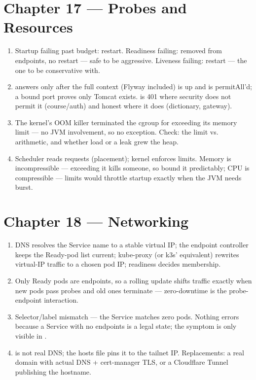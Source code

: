 \section*{Chapter 17 --- Probes and Resources}
\begin{enumerate}
  \item Startup failing past budget: restart. Readiness failing:
  removed from endpoints, no restart --- safe to be aggressive.
  Liveness failing: restart --- the one to be conservative with.
  \item {} answers only after the full context
  (Flyway included) is up and is permitAll'd; a bound port proves
  only Tomcat exists.  is 401 where security
  does not permit it (course/auth) and honest where it does
  (dictionary, gateway).
  \item The kernel's OOM killer terminated the cgroup for exceeding
  its memory limit --- no JVM involvement, so no exception. Check:
  the limit vs.\  arithmetic, and whether
  load or a leak grew the heap.
  \item Scheduler reads requests (placement); kernel enforces limits.
  Memory is incompressible --- exceeding it kills someone, so bound
  it predictably; CPU is compressible --- limits would throttle
  startup exactly when the JVM needs burst.
\end{enumerate}

\section*{Chapter 18 --- Networking}
\begin{enumerate}
  \item DNS resolves the Service name to a stable virtual IP; the
  endpoint controller keeps the Ready-pod list current; kube-proxy
  (or k3s' equivalent) rewrites virtual-IP traffic to a chosen pod
  IP; readiness decides membership.
  \item Only Ready pods are endpoints, so a rolling update shifts
  traffic exactly when new pods pass probes and old ones terminate
  --- zero-downtime is the probe-endpoint interaction.
  \item Selector/label mismatch --- the Service matches zero pods.
  Nothing errors because a Service with no endpoints is a legal
  state; the symptom is only visible in .
  \item {} is not real DNS; the hosts file pins it to
  the tailnet IP. Replacements: a real domain with actual DNS +
  cert-manager TLS, or a Cloudflare Tunnel publishing the hostname.
\end{enumerate}


